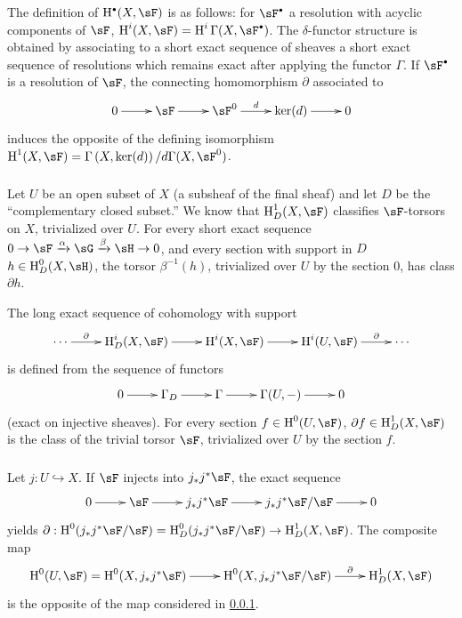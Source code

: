 The definition of $\h^\bullet(X,\sF)$ is as follows: for $\sF^\bullet$ a
resolution with acyclic components of $\sF$,
$\h^i(X,\sF) = \h^i\Gamma(X,\sF^\bullet)$. The $\delta$-functor
structure is obtained by associating to a short exact sequence of sheaves a short
exact sequence of resolutions which remains exact after applying the
functor $\Gamma$. If $\sF^\bullet$ is a resolution of $\sF$,
the connecting homomorphism $\partial$ associated to
\[\xymatrix{
  0 \ar[r]
    & \sF \ar[r]
    & \sF^0 \ar[r]^-d
    & \ker(d) \ar[r]
    & 0
}\]
induces the opposite of the defining isomorphism
$\h^1(X,\sF) = \Gamma\left(X,\ker(d)\right)/d \Gamma(X,\sF^0)$.




\subsubsection{}\label{IV:1-1-4}

Let $U$ be an open subset of $X$ (a subsheaf of the final sheaf) and
let $D$ be the ``complementary closed subset.'' We know that $\h_D^1(X,\sF)$
classifies $\sF$-torsors on $X$, trivialized over $U$. For every short
exact sequence $0\to \sF\xrightarrow\alpha \sG\xrightarrow\beta\sH\to 0$, and
every section with support in $D$ $h\in\h_D^0(X,\sH)$, the torsor
$\beta^{-1}(h)$, trivialized over $U$ by the section $0$, has class
$\partial h$.

The long exact sequence of cohomology with support
\[\xymatrix{
  \cdots \ar[r]^-\partial
    & \h_D^i(X,\sF) \ar[r]
    & \h^i(X,\sF) \ar[r]
    & \h^i(U,\sF) \ar[r]^-\partial
    & \cdots
}\]
is defined from the sequence of functors
\[\xymatrix{
  0 \ar[r]
    & \Gamma_D \ar[r]
    & \Gamma \ar[r]
    & \Gamma(U,-) \ar[r]
    & 0
}\]
(exact on injective sheaves). For every section $f\in \h^0(U,\sF)$,
$\partial f\in \h_D^1(X,\sF)$ is the class of the trivial torsor $\sF$,
trivialized over $U$ by the section $f$.




\subsubsection{}\label{IV:1-1-5}

Let $j:U\hookrightarrow X$. If $\sF$ injects into $j_* j^* \sF$, the exact
sequence
\[\xymatrix{
  0 \ar[r]
  & \sF \ar[r]
  & j_* j^* \sF \ar[r]
  & j_* j^* \sF / \sF \ar[r]
  & 0
}\]
yields
$\partial:\h^0(j_* j^*\sF/\sF) = \h_D^0(j_* j^* \sF/\sF) \to \h_D^1(X,\sF)$.
The composite map
\[\xymatrix{
  \h^0(U,\sF) = \h^0(X,j_* j^*\sF) \ar[r]
    & \h^0(X,j_* j^*\sF / \sF) \ar[r]^-\partial
    & \h_D^1(X,\sF)
}\]
is the opposite of the map considered in \ref{IV:1-1-4}.




